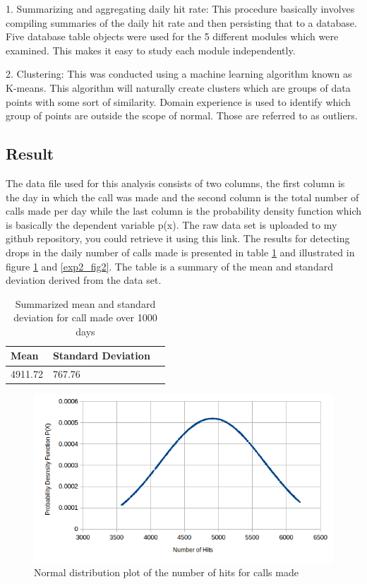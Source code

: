 \documentclass[12pt, letterpaper, titlepage]{report}
\begin{document}
1. Summarizing and aggregating daily hit rate: This procedure basically involves compiling summaries of the daily hit rate and then persisting that to a database. Five database table objects were used  for the 5 different modules which were examined. This makes it easy to study each module independently. 

2. Clustering: This was conducted using a machine learning algorithm known as K-means. This algorithm will naturally create clusters which are groups of data points with some sort of similarity. Domain experience is used to identify which group of points are outside the scope of normal. Those are referred to as outliers.

\subsection{Result} 
The data file used for this analysis consists of two columns, the first column is the day in which the call was made and the second column is the total number of calls made per day while the last column is the probability density function which is basically the dependent variable p(x). 
The raw data set is uploaded to my github repository, you could retrieve it using this link.
The results for detecting drops in the daily number of calls made is presented in table \ref{exp2_tab1}  and illustrated in figure \ref{exp2_fig1} and \ref{exp2_fig2}. The table is a summary of the mean and standard deviation derived from the data set.

\begin{table}[h!]
	\centering
	\begin{tabular}{|l|l|l|}
		\hline
		\textbf{Mean} & \textbf{Standard Deviation} \\ \hline
		4911.72        & 767.76                        \\ \hline
	\end{tabular}
	\caption{Summarized mean and standard deviation for call made over 1000 days}
	\label{exp2_tab1}
\end{table}

\begin{figure}[h]
	\centering
	\includegraphics{call_hits_normal_distribution.png}
	\caption{Normal distribution plot of the number of hits for calls made}
	\label{exp2_fig1}
\end{figure}
\end{document}

